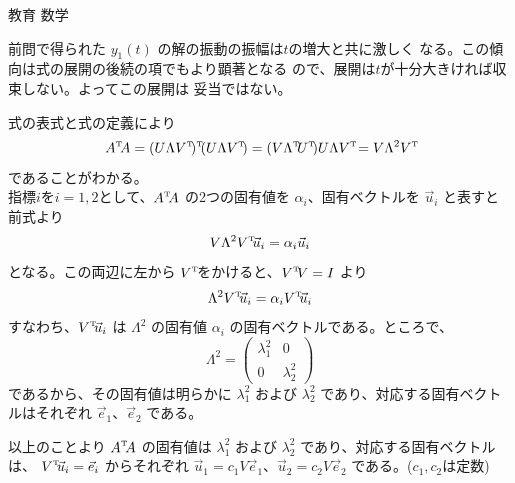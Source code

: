 \documentclass[fleqn]{jbook}
\begin{document}
\begin{answer}{教育 数学}{}
\begin{subanswers}
\begin{subsubanswers}
  \SubSubAnswer
    前問で得られた $y_1(t)$ の解の振動の振幅は$t$の増大と共に激しく
    なる。この傾向は式の展開の後続の項でもより顕著となる
    ので、展開は$t$が十分大きければ収束しない。よってこの展開は
    妥当ではない。

  \end{subsubanswers}

  
\SubAnswer
  \begin{subsubanswers}

  \SubSubAnswer
    式の表式と式の定義により
%
    \[ \Trans{A}A = \Trans{(U\Lambda\Trans{V})}(U\Lambda\Trans{V}) = %
       (V \Trans{\Lambda} \Trans{U} ) U \Lambda \Trans{V} = %
       V \Lambda^2 \Trans{V} \]
%
    であることがわかる。\\
%
    指標$i$を$i=1,2$として、$\Trans{A}A$ の2つの固有値を
    $\alpha_i$、固有ベクトルを $\vec{u}_i$ と表すと前式より
%
    \[ V \Lambda^2 \Trans{V} \vec{u}_i = \alpha_i \vec{u}_i \]
%
    となる。この両辺に左から $\Trans{V}$をかけると、$\Trans{V}V=I$
    より
%
    \[ \Lambda^2\Trans{V}\vec{u}_i = \alpha_i\Trans{V}\vec{u}_i \]
%
    すなわち、$\Trans{V}\vec{u}_i$ は $\Lambda^2$ の固有値 $\alpha_i$
    の固有ベクトルである。ところで、
%
    \[ \Lambda^2 = \begin{pmatrix}
                       \lambda_1^2 & 0 \\%
                       0 & \lambda_2^2 \end{pmatrix} \]
%
    であるから、その固有値は明らかに $\lambda_1^2$ および $\lambda_2^2$
    であり、対応する固有ベクトルはそれぞれ $\vec{e}_1$、$\vec{e}_2$ 
    である。

    以上のことより $\Trans{A}A$ の固有値は $\lambda_1^2$ および
    $\lambda_2^2$ であり、対応する固有ベクトルは、
    $\Trans{V}\vec{u}_i = \vec{e}_i$ からそれぞれ
    $\vec{u}_1 = c_1 V \vec{e}_1$、$\vec{u}_2 = c_2 V \vec{e}_2$
    である。($c_1,c_2$は定数)



\end{subsubanswers}
\end{subanswers}
\end{answer}
\end{document}
